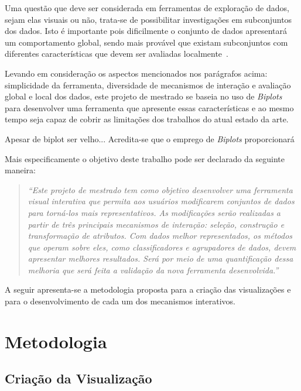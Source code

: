 Uma questão que deve ser considerada em ferramentas de
exploração de dados, sejam elas visuais ou não, trata-se de
possibilitar investigações em subconjuntos dos dados. Isto é
importante pois dificilmente o conjunto de dados apresentará
um comportamento global, sendo mais provável que existam
subconjuntos com diferentes características que devem ser
avaliadas localmente~\cite{May2011}.

Levando em consideração os aspectos mencionados nos
parágrafos acima: simplicidade da ferramenta, diversidade de
mecanismos de interação e avaliação global e local dos
dados, este projeto de mestrado se baseia no uso de
\emph{Biplots} para desenvolver uma ferramenta que apresente
essas características e ao mesmo tempo seja capaz de cobrir
as limitações dos trabalhos do atual estado da arte.

Apesar de biplot ser velho...
Acredita-se que o emprego de \emph{Biplots} proporcionará 

Mais especificamente o objetivo deste trabalho pode ser
declarado da seguinte maneira:

\begin{quote}
    \emph{``Este projeto de mestrado tem como objetivo
        desenvolver uma ferramenta visual interativa que
        permita aos usuários modificarem conjuntos de dados
        para torná-los mais representativos. As modificações
        serão realizadas a partir de três principais
        mecanismos de interação: seleção, construção e
        transformação de atributos. Com dados melhor
        representados, os métodos que operam sobre eles,
        como classificadores e agrupadores de dados, devem
        apresentar melhores resultados. Será por meio de uma
        quantificação dessa melhoria que será feita a
    validação da nova ferramenta desenvolvida.''}
\end{quote}

A seguir apresenta-se a metodologia proposta para a criação
das visualizações e para o desenvolvimento de cada um dos
mecanismos interativos.

\section{Metodologia}


\subsection{Criação da Visualização}

